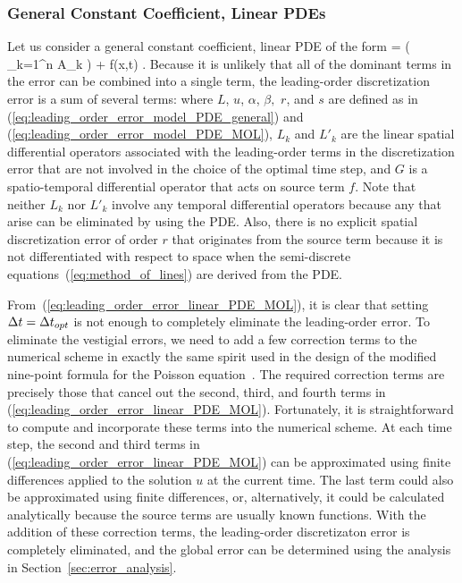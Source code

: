 \documentclass[oneeqnum,onefignum,onetabnum,onethmnum]{siamltex}
\begin{document}
\subsubsection*{\label{sec:ots_linear_pde} 
            General Constant Coefficient, Linear PDEs} 
Let us consider a general constant coefficient, linear PDE of the form
\beq
   = 
  \left( \sum_{k=1}^n A_k  \right) + f(x,t)
  \label{eq:linear_PDE}.
\eeq
Because it is unlikely that all of the dominant terms in the error can be
combined into a single term, the leading-order discretization error is
a sum of several terms:
\bea
  \dt{}
  \label{eq:leading_order_error_linear_PDE_MOL}
\eea
where $L$, $u$, $\alpha$, $\beta,$ $r$, and $s$ are defined as in
(\ref{eq:leading_order_error_model_PDE_general}) and
(\ref{eq:leading_order_error_model_PDE_MOL}), 
$L_k$ and $L'_k$ are the linear spatial differential operators associated 
with the leading-order terms in the discretization error that are not involved 
in the choice of the optimal time step, and $G$ is a spatio-temporal 
differential operator that acts on source term $f$.  
Note that neither $L_k$ nor $L'_k$ involve any temporal differential 
operators because any that arise can be eliminated by using the PDE.  Also, 
there is no explicit spatial discretization error of order $r$ that originates 
from the source term because it is not differentiated with respect to space 
when the semi-discrete equations~(\ref{eq:method_of_lines}) are derived from 
the PDE.

From~(\ref{eq:leading_order_error_linear_PDE_MOL}), it is clear that setting 
$\Delta t = \Delta t_{opt}$ is not enough to completely eliminate the 
leading-order error.  To eliminate the vestigial errors, we need to add a few 
correction terms to the numerical scheme in exactly the same spirit used in 
the design of the modified nine-point formula for the Poisson 
equation~\cite{iserles_book}.  The required correction terms are precisely 
those that cancel out the second, third, and fourth terms in 
(\ref{eq:leading_order_error_linear_PDE_MOL}).  Fortunately, it is 
straightforward to compute and incorporate these terms into the numerical 
scheme.  At each time step, the second and third terms in 
(\ref{eq:leading_order_error_linear_PDE_MOL}) can be approximated using
finite differences applied to the solution $u$ at the current time.
The last term could also be approximated using finite differences, or,
alternatively, it could be calculated analytically because the source terms 
are usually known functions.  With the addition of these correction terms, 
the leading-order discretizaton error is completely eliminated, and the
global error can be determined using the analysis in 
Section~\ref{sec:error_analysis}.
\end{document}
